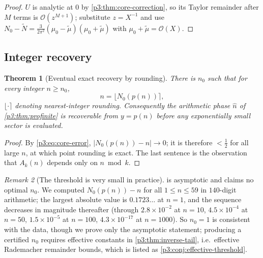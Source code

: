 \documentclass[11pt,a4paper,oneside]{book}
\theoremstyle{plain}
\newtheorem{theorem}{Theorem}[chapter]
\theoremstyle{definition}
\theoremstyle{remark}
\newtheorem{remark}[theorem]{Remark}
\newcommand{\bigO}{\mathcal{O}}
\begin{document}
\begin{proof}
$U$ is analytic at $0$ by \cref{p3:thm:core-correction}, so its Taylor remainder after $M$ terms
is $\bigO(z^{M+1})$; substitute $z=X^{-1}$ and use $N_{0}-\widetilde
N=\frac3{2\pi^{2}}(\mu_{0}-\widetilde\mu) (\mu_{0}+\widetilde\mu)$ with
$\mu_{0}+\widetilde\mu=\bigO(X)$.
\end{proof}

\subsection{Integer recovery}

\begin{theorem}[Eventual exact recovery by rounding]\label{p3:thm:rounding}
There is $n_{0}$ such that for every integer $n\ge n_{0}$,
\begin{equation}\label{p3:eq:rounding}
 n=\bigl\lfloor N_{0}(p(n))\bigr\rceil,
\end{equation}
$\lfloor\cdot\rceil$ denoting nearest-integer rounding. Consequently the arithmetic phase
$\widehat n$ of \cref{p3:thm:profinite} is recoverable from $y=p(n)$ \emph{before} any
exponentially small sector is evaluated.
\end{theorem}

\begin{proof}
By \cref{p3:eq:core-error}, $|N_{0}(p(n))-n|\to0$; it is therefore $<\tfrac12$ for all large $n$,
at which point rounding is exact. The last sentence is the observation that $A_{k}(n)$ depends
only on $n\bmod k$.
\end{proof}

\begin{remark}[The threshold is very small in practice]
\label{p3:rem:threshold}
 is asymptotic and claims no optimal $n_{0}$. We computed $N_{0}(p(n))-n$
for all $1\le n\le 59$ in $140$-digit arithmetic; the largest absolute value is $0.1723\ldots$ at
$n=1$, and the sequence decreases in magnitude thereafter (through $2.8\times10^{-2}$ at $n=10$,
$4.5\times10^{-4}$ at $n=50$, $1.5\times10^{-5}$ at $n=100$, $4.3\times10^{-17}$ at $n=1000$). So
$n_{0}=1$ is consistent with the data, though we prove only the asymptotic statement; producing a
certified $n_{0}$ requires effective constants in \cref{p3:thm:inverse-tail}, i.e.\ effective
Rademacher remainder bounds, which is listed as \cref{p3:conj:effective-threshold}.
\end{remark}
\end{document}
